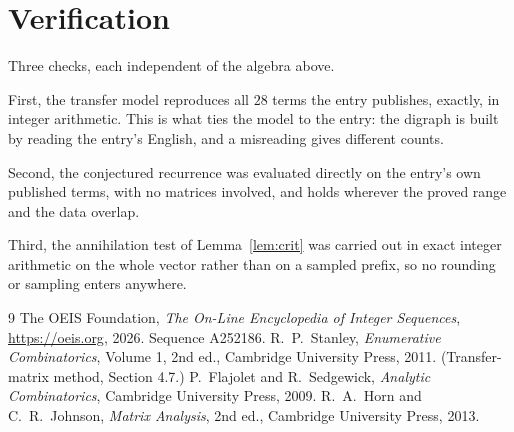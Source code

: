 \documentclass[11pt,a4paper]{article}
\theoremstyle{plain}
\theoremstyle{definition}
\begin{document}
\section{Verification}

Three checks, each independent of the algebra above.

First, the transfer model reproduces all $28$ terms the entry publishes, exactly, in
integer arithmetic. This is what ties the model to the entry: the digraph is built by reading
the entry's English, and a misreading gives different counts.

Second, the conjectured recurrence was evaluated directly on the entry's own published terms,
with no matrices involved, and holds wherever the proved range and the data overlap.

Third, the annihilation test of Lemma~\ref{lem:crit} was carried out in exact integer
arithmetic on the whole vector rather than on a sampled prefix, so no rounding or sampling
enters anywhere.

\begin{thebibliography}{9}
 The OEIS Foundation, \emph{The On-Line Encyclopedia of Integer
Sequences}, \url{https://oeis.org}, 2026. Sequence A252186.
 R.~P.~Stanley, \emph{Enumerative Combinatorics}, Volume 1, 2nd ed.,
Cambridge University Press, 2011. (Transfer-matrix method, Section 4.7.)
 P.~Flajolet and R.~Sedgewick, \emph{Analytic Combinatorics}, Cambridge
University Press, 2009.
 R.~A.~Horn and C.~R.~Johnson, \emph{Matrix Analysis}, 2nd ed., Cambridge
University Press, 2013.
\end{thebibliography}
\end{document}
